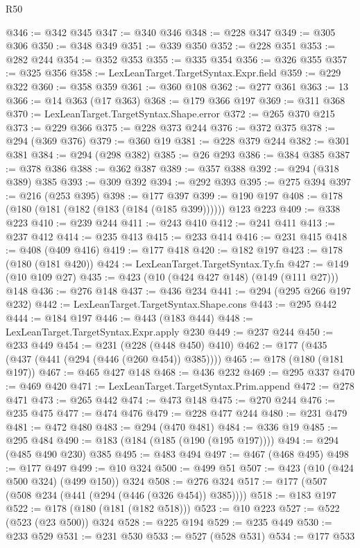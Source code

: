 \begin{lexlean}{R50}
\begin{coremodule}
@346 := @342 @345
@347 := @340 @346
@348 := @228 @347
@349 := @305 @306
@350 := @348 @349
@351 := @339 @350
@352 := @228 @351
@353 := @282 @244
@354 := @352 @353
@355 := @335 @354
@356 := @326 @355
@357 := @325 @356
@358 := LexLeanTarget.TargetSyntax.Expr.field
@359 := @229 @322
@360 := @358 @359
@361 := @360 @108
@362 := @277 @361
@363 := 13
@366 := @14 @363 (@17 @363)
@368 := @179 @366 @197
@369 := @311 @368
@370 := LexLeanTarget.TargetSyntax.Shape.error
@372 := @265 @370 @215
@373 := @229 @366
@375 := @228 @373 @244
@376 := @372 @375
@378 := @294 (@369 @376)
@379 := @360 @19
@381 := @228 @379 @244
@382 := @301 @381
@384 := @294 (@298 @382)
@385 := @26 @293
@386 := @384 @385
@387 := @378 @386
@388 := @362 @387
@389 := @357 @388
@392 := @294 (@318 @389) @385
@393 := @309 @392
@394 := @292 @393
@395 := @275 @394
@397 := @216 (@253 @395)
@398 := @177 @397
@399 := @190 @197
@408 := @178 (@180 (@181 (@182 (@183 (@184 (@185 @399)))))) @123 @223
@409 := @338 @223
@410 := @239 @244
@411 := @243 @410
@412 := @241 @411
@413 := @237 @412
@414 := @235 @413
@415 := @233 @414
@416 := @231 @415
@418 := @408 (@409 @416)
@419 := @177 @418
@420 := @182 @197
@423 := @178 (@180 (@181 @420))
@424 := LexLeanTarget.TargetSyntax.Ty.fn
@427 := @149 (@10 @109 @27)
@435 := @423 (@10 (@424 @427 @148) (@149 (@111 @27))) @148
@436 := @276 @148
@437 := @436 @234
@441 := @294 (@295 @266 @197 @232)
@442 := LexLeanTarget.TargetSyntax.Shape.cons
@443 := @295 @442
@444 := @184 @197
@446 := @443 (@183 @444)
@448 := LexLeanTarget.TargetSyntax.Expr.apply @230
@449 := @237 @244
@450 := @233 @449
@454 := @231 (@228 (@448 @450) @410)
@462 := @177 (@435 (@437 (@441 (@294 (@446 (@260 @454)) @385))))
@465 := @178 (@180 (@181 @197))
@467 := @465 @427 @148
@468 := @436 @232
@469 := @295 @337
@470 := @469 @420
@471 := LexLeanTarget.TargetSyntax.Prim.append
@472 := @278 @471
@473 := @265 @442
@474 := @473 @148
@475 := @270 @244
@476 := @235 @475
@477 := @474 @476
@479 := @228 @477 @244
@480 := @231 @479
@481 := @472 @480
@483 := @294 (@470 @481)
@484 := @336 @19
@485 := @295 @484
@490 := @183 (@184 (@185 (@190 (@195 @197))))
@494 := @294 (@485 @490 @230) @385
@495 := @483 @494
@497 := @467 (@468 @495)
@498 := @177 @497
@499 := @10 @324
@500 := @499 @51
@507 := @423 (@10 (@424 @500 @324) (@499 @150)) @324
@508 := @276 @324
@517 := @177 (@507 (@508 @234 (@441 (@294 (@446 (@326 @454)) @385))))
@518 := @183 @197
@522 := @178 (@180 (@181 (@182 @518)))
@523 := @10 @223
@527 := @522 (@523 (@23 @500)) @324
@528 := @225 @194
@529 := @235 @449
@530 := @233 @529
@531 := @231 @530
@533 := @527 (@528 @531)
@534 := @177 @533

\end{coremodule}
\end{lexlean}
